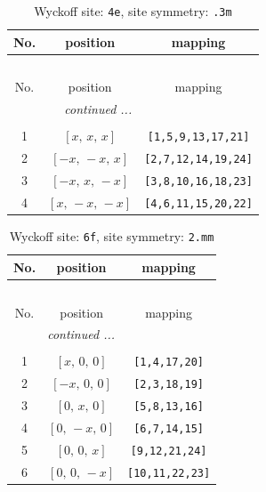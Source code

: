 \documentclass[fleqn,8pt]{jsarticle}
\begin{document}
\begin{longtable}{ccc}
\caption{Wyckoff site: {\tt 4e}, site symmetry: {\tt .3m}}
 \\
 \hline \hline
No. & position & mapping \\ \hline \endfirsthead

\multicolumn{2}{l}{\tablename\ \thetable{}} \\
 \hline \hline
No. & position & mapping \\ \hline \endhead

 \hline \hline
\multicolumn{2}{r}{\footnotesize\it continued ...} \\ \endfoot

 \hline \hline
\multicolumn{2}{r}{} \\ \endlastfoot

1 & $\left[ x,\, x,\, x \right]$ & {\tt [1,5,9,13,17,21]} \\ \hline
2 & $\left[ - x,\, - x,\, x \right]$ & {\tt [2,7,12,14,19,24]} \\ \hline
3 & $\left[ - x,\, x,\, - x \right]$ & {\tt [3,8,10,16,18,23]} \\ \hline
4 & $\left[ x,\, - x,\, - x \right]$ & {\tt [4,6,11,15,20,22]} \\
\end{longtable}
\renewcommand{\arraystretch}{1.2}
\begin{longtable}{ccc}
\caption{Wyckoff site: {\tt 6f}, site symmetry: {\tt 2.mm}}
 \\
 \hline \hline
No. & position & mapping \\ \hline \endfirsthead

\multicolumn{2}{l}{\tablename\ \thetable{}} \\
 \hline \hline
No. & position & mapping \\ \hline \endhead

 \hline \hline
\multicolumn{2}{r}{\footnotesize\it continued ...} \\ \endfoot

 \hline \hline
\multicolumn{2}{r}{} \\ \endlastfoot

1 & $\left[ x,\, 0,\, 0 \right]$ & {\tt [1,4,17,20]} \\ \hline
2 & $\left[ - x,\, 0,\, 0 \right]$ & {\tt [2,3,18,19]} \\ \hline
3 & $\left[ 0,\, x,\, 0 \right]$ & {\tt [5,8,13,16]} \\ \hline
4 & $\left[ 0,\, - x,\, 0 \right]$ & {\tt [6,7,14,15]} \\ \hline
5 & $\left[ 0,\, 0,\, x \right]$ & {\tt [9,12,21,24]} \\ \hline
6 & $\left[ 0,\, 0,\, - x \right]$ & {\tt [10,11,22,23]} \\
\end{longtable}
\end{document}
